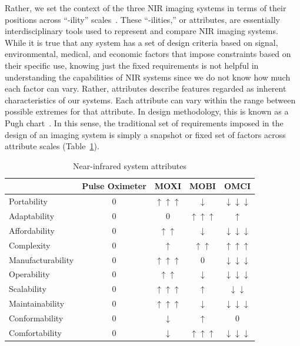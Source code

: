 Rather, we set the context of the three \ac{NIR} imaging systems in terms of their positions across ``-ility'' scales~\cite{DeWeck2012}. These ``-ilities,'' or attributes, are essentially interdisciplinary tools used to represent and compare \ac{NIR} imaging systems. While it is true that any system has a set of design criteria based on signal, environmental, medical, and economic factors that impose constraints based on their specific use, knowing just the fixed requirements is not helpful in understanding the capabilities of \ac{NIR} systems since we do not know how much each factor can vary. Rather, attributes describe features regarded as inherent characteristics of our systems. Each attribute can vary within the range between possible extremes for that attribute. In design methodology, this is known as a Pugh chart~\cite{Pugh1981}.  In this sense, the traditional set of requirements imposed in the design of an imaging system is simply a snapshot or fixed set of factors across attribute scales (Table~\ref{tab:pughtable}). 

\begin{table}[]
\centering
\caption{Near-infrared system attributes}
\label{tab:pughtable}
\begin{tabular}{@{}lcccc@{}}
\toprule
                  & Pulse Oximeter & MOXI                      & MOBI                      & OMCI                            \\ \midrule
Portability       & 0              & $\uparrow \uparrow \uparrow$ & $\downarrow$               & $\downarrow \downarrow \downarrow$ \\
Adaptability      & 0              & 0                         & $\uparrow \uparrow \uparrow$ & $\uparrow$                       \\
Affordability     & 0              & $\uparrow \uparrow$         & $\downarrow$               & $\downarrow \downarrow \downarrow$ \\
Complexity        & 0              & $\uparrow$                 & $\uparrow \uparrow$         & $\uparrow \uparrow \uparrow$       \\
Manufacturability & 0              & $\uparrow \uparrow \uparrow$ & 0                         & $\downarrow \downarrow \downarrow$ \\
Operability       & 0              & $\uparrow \uparrow$         & $\downarrow$               & $\downarrow \downarrow \downarrow$ \\
Scalability       & 0              & $\uparrow \uparrow \uparrow$ & $\uparrow$                 & $\downarrow \downarrow$           \\
Maintainability   & 0              & $\uparrow \uparrow \uparrow$ & $\downarrow$               & $\downarrow \downarrow \downarrow$ \\
Conformability    & 0              & $\downarrow$               & $\uparrow$                 & 0                               \\
Comfortability    & 0              & $\downarrow$               & $\uparrow \uparrow \uparrow$ & $\downarrow \downarrow \downarrow$ \\ \bottomrule
\end{tabular}
\end{table}

